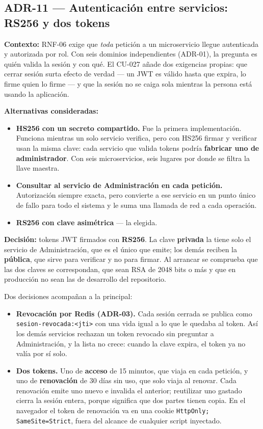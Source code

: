 \documentclass[11pt,a4paper]{article}
\begin{document}
\subsection*{ADR-11 --- Autenticación entre servicios: RS256 y dos tokens}

\textbf{Contexto:} RNF-06 exige que \textit{toda} petición a un microservicio llegue autenticada y
autorizada por rol. Con seis dominios independientes (ADR-01), la pregunta es quién valida la sesión
y con qué. El CU-027 añade dos exigencias propias: que cerrar sesión surta efecto de verdad --- un
JWT es válido hasta que expira, lo firme quien lo firme --- y que la sesión no se caiga sola mientras
la persona está usando la aplicación.

\textbf{Alternativas consideradas:}
\begin{itemize}
  \item \textbf{HS256 con un secreto compartido.} Fue la primera implementación. Funciona mientras
        un solo servicio verifica, pero con HS256 firmar y verificar usan la misma clave: cada
        servicio que valida tokens podría \textbf{fabricar uno de administrador}. Con seis
        microservicios, seis lugares por donde se filtra la llave maestra.
  \item \textbf{Consultar al servicio de Administración en cada petición.} Autorización siempre
        exacta, pero convierte a ese servicio en un punto único de fallo para todo el sistema y le
        suma una llamada de red a cada operación.
  \item \textbf{RS256 con clave asimétrica} --- la elegida.
\end{itemize}

\textbf{Decisión:} tokens JWT firmados con \textbf{RS256}. La clave \textbf{privada} la tiene solo
el servicio de Administración, que es el único que emite; los demás reciben la \textbf{pública}, que
sirve para verificar y no para firmar. Al arrancar se comprueba que las dos claves se correspondan,
que sean RSA de 2048 bits o más y que en producción no sean las de desarrollo del repositorio.

Dos decisiones acompañan a la principal:

\begin{itemize}
  \item \textbf{Revocación por Redis (ADR-03).} Cada sesión cerrada se publica como
        \texttt{sesion-revocada:<jti>} con una vida igual a lo que le quedaba al token. Así los
        demás servicios rechazan un token revocado sin preguntar a Administración, y la lista no
        crece: cuando la clave expira, el token ya no valía por sí solo.
  \item \textbf{Dos tokens.} Uno de \textbf{acceso} de 15 minutos, que viaja en cada petición, y uno
        de \textbf{renovación} de 30 días sin uso, que solo viaja al renovar. Cada renovación emite
        uno nuevo e invalida el anterior; reutilizar uno gastado cierra la sesión entera, porque
        significa que dos partes tienen copia. En el navegador el token de renovación va en una
        cookie \texttt{HttpOnly; SameSite=Strict}, fuera del alcance de cualquier script inyectado.
\end{itemize}
\end{document}
